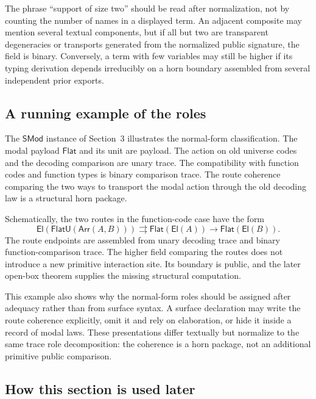 \documentclass{lmcs}
\begin{document}
\begin{rem}
The phrase ``support of size two'' should be read after normalization, not by counting the
number of names in a displayed term.  An adjacent composite may mention several textual
components, but if all but two are transparent degeneracies or transports generated from the
normalized public signature, the field is binary.  Conversely, a term with few variables may
still be higher if its typing derivation depends irreducibly on a horn boundary assembled from
several independent prior exports.
\end{rem}

\subsection{A running example of the roles}

The \(\mathsf{SMod}\) instance of Section~3 illustrates the normal-form classification.  The
modal payload \(\mathsf{Flat}\) and its unit are payload.  The action on old universe codes
and the decoding comparison are unary trace.  The compatibility with function codes and
function types is binary comparison trace.  The route coherence comparing the two ways to
transport the modal action through the old decoding law is a structural horn package.

Schematically, the two routes in the function-code case have the form
\[
  \mathsf{El}(\mathsf{FlatU}(\mathsf{Arr}(A,B)))
  \rightrightarrows
  \mathsf{Flat}(\mathsf{El}(A)) \to \mathsf{Flat}(\mathsf{El}(B)).
\]
The route endpoints are assembled from unary decoding trace and binary function-comparison
trace.  The higher field comparing the routes does not introduce a new primitive interaction
site.  Its boundary is public, and the later open-box theorem supplies the missing
structural computation.

This example also shows why the normal-form roles should be assigned after adequacy rather
than from surface syntax.  A surface declaration may write the route coherence explicitly,
omit it and rely on elaboration, or hide it inside a record of modal laws.  These
presentations differ textually but normalize to the same trace role decomposition: the
coherence is a horn package, not an additional primitive public comparison.

\subsection{How this section is used later}
\end{document}
